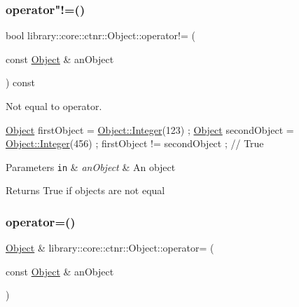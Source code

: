 \subsubsection{\texorpdfstring{operator"!=()}{operator!=()}}
{\footnotesize\ttfamily bool library\+::core\+::ctnr\+::\+Object\+::operator!= (\begin{DoxyParamCaption}\item[{const \hyperlink{classlibrary_1_1core_1_1ctnr_1_1_object}{Object} \&}]{an\+Object }\end{DoxyParamCaption}) const}



Not equal to operator. 


\begin{DoxyCode}
\hyperlink{classlibrary_1_1core_1_1ctnr_1_1_object_a51bb72dec3a1b2738e0ad92b977b8d8d}{Object} firstObject = \hyperlink{classlibrary_1_1core_1_1ctnr_1_1_object_a8a8b1ef718d092c154011cf5c37373bb}{Object::Integer}(123) ;
\hyperlink{classlibrary_1_1core_1_1ctnr_1_1_object_a51bb72dec3a1b2738e0ad92b977b8d8d}{Object} secondObject = \hyperlink{classlibrary_1_1core_1_1ctnr_1_1_object_a8a8b1ef718d092c154011cf5c37373bb}{Object::Integer}(456) ;
firstObject != secondObject ; \textcolor{comment}{// True}
\end{DoxyCode}



\begin{DoxyParams}[1]{Parameters}
\mbox{\tt in}  & {\em an\+Object} & An object \\
\hline
\end{DoxyParams}
\begin{DoxyReturn}{Returns}
True if objects are not equal 
\end{DoxyReturn}
\mbox{\label{classlibrary_1_1core_1_1ctnr_1_1_object_a48f26f6297266090793fc53862654122}} 
\subsubsection{\texorpdfstring{operator=()}{operator=()}}
{\footnotesize\ttfamily \hyperlink{classlibrary_1_1core_1_1ctnr_1_1_object}{Object} \& library\+::core\+::ctnr\+::\+Object\+::operator= (\begin{DoxyParamCaption}\item[{const \hyperlink{classlibrary_1_1core_1_1ctnr_1_1_object}{Object} \&}]{an\+Object }\end{DoxyParamCaption})}



